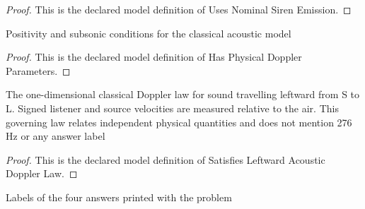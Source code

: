 \begin{proof}
  This is the declared model definition of Uses Nominal Siren Emission.
\end{proof}
\begin{definition}
  \label{def:physics:phyx-mini-0194:phyxminiproblems-problemphyxmini0194-hasphysicaldopplerparameters}
  Positivity and subsonic conditions for the classical acoustic model
\end{definition}
\begin{proof}
  This is the declared model definition of Has Physical Doppler Parameters.
\end{proof}
\begin{definition}
  \label{def:physics:phyx-mini-0194:phyxminiproblems-problemphyxmini0194-satisfiesleftwardacousticdopplerlaw}
  The one-dimensional classical Doppler law for sound travelling leftward from S to L. Signed listener and source velocities are measured relative to the air. This governing law relates independent physical quantities and does not mention 276 Hz or any answer label
\end{definition}
\begin{proof}
  This is the declared model definition of Satisfies Leftward Acoustic Doppler Law.
\end{proof}
\begin{definition}
  \label{def:physics:phyx-mini-0194:phyxminiproblems-problemphyxmini0194-answerchoice}
  Labels of the four answers printed with the problem
\end{definition}
